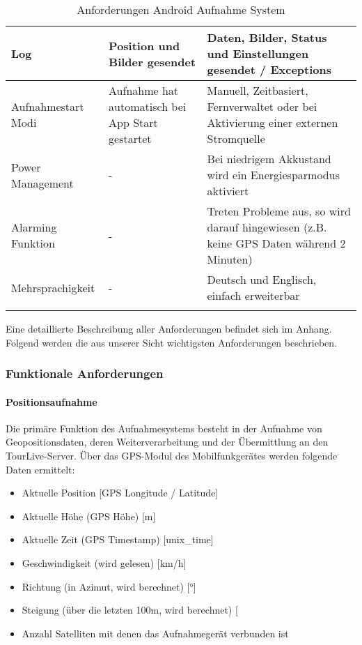 {\begin{longtable}{  p{3.5cm} | p{4.3cm} | p{4.3cm} }
    \hline 
    Log & Position und Bilder gesendet & Daten, Bilder, Status und Einstellungen gesendet / Exceptions\\
    \hline 
    Aufnahmestart Modi & Aufnahme hat automatisch bei App Start gestartet & Manuell, Zeitbasiert, Fernverwaltet oder bei Aktivierung einer externen Stromquelle\\
    \hline 
   	Power Management & - & Bei niedrigem Akkustand wird ein Energiesparmodus aktiviert\\
    \hline 
    Alarming Funktion & - & Treten Probleme aus, so wird darauf hingewiesen (z.B. keine GPS Daten w\"{a}hrend 2 Minuten)\\
    \hline 
    Mehrsprachigkeit & - & Deutsch und Englisch, einfach erweiterbar\\

    
    
\caption{Anforderungen Android Aufnahme System}
\end{longtable}}

Eine detaillierte Beschreibung aller Anforderungen befindet sich im Anhang. Folgend werden die aus unserer Sicht wichtigsten Anforderungen beschrieben.

\subsubsection{Funktionale Anforderungen}
\paragraph{Positionsaufnahme}
Die prim\"{a}re Funktion des Aufnahmesystems besteht in der Aufnahme von Geopositionsdaten, deren Weiterverarbeitung und der Übermittlung an den TourLive-Server. Über das GPS-Modul des Mobilfunkger\"{a}tes werden folgende Daten ermittelt:
\begin{itemize}
\item Aktuelle Position [GPS Longitude / Latitude]
\item Aktuelle H\"{o}he (GPS H\"{o}he) [m]
\item Aktuelle Zeit (GPS Timestamp) [unix\_time]
\item Geschwindigkeit (wird gelesen) [km/h]
\item Richtung (in Azimut, wird berechnet) [°]
\item Steigung (\"{u}ber die letzten 100m, wird berechnet) [%
\item Anzahl Satelliten mit denen das Aufnahmeger\"{a}t verbunden ist
\end{itemize}

